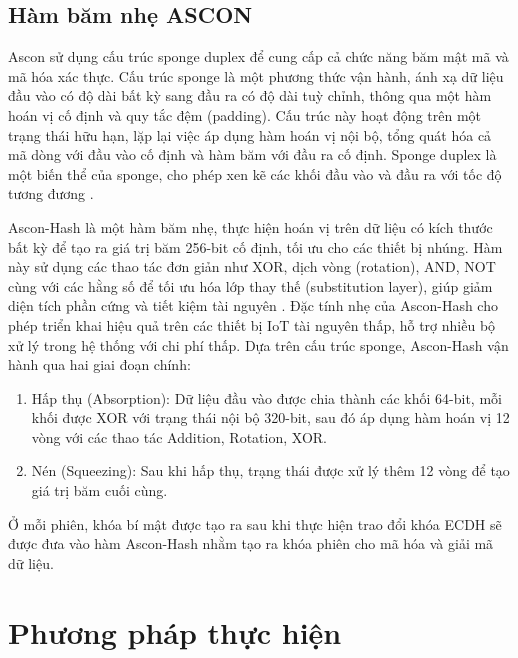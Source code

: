 \subsection{Hàm băm nhẹ ASCON}
\label{sec:ascon-hash}
Ascon sử dụng cấu trúc sponge duplex để cung cấp cả chức năng băm mật mã và mã hóa xác thực. Cấu trúc sponge là một phương thức vận hành, ánh xạ dữ liệu đầu vào có độ dài bất kỳ sang đầu ra có độ dài tuỳ chỉnh, thông qua một hàm hoán vị cố định và quy tắc đệm (padding). Cấu trúc này hoạt động trên một trạng thái hữu hạn, lặp lại việc áp dụng hàm hoán vị nội bộ, tổng quát hóa cả mã dòng với đầu vào cố định và hàm băm với đầu ra cố định. Sponge duplex là một biến thể của sponge, cho phép xen kẽ các khối đầu vào và đầu ra với tốc độ tương đương \cite{Ascon-Hash}.

Ascon-Hash là một hàm băm nhẹ, thực hiện hoán vị trên dữ liệu có kích thước bất kỳ để tạo ra giá trị băm 256-bit cố định, tối ưu cho các thiết bị nhúng. Hàm này sử dụng các thao tác đơn giản như XOR, dịch vòng (rotation), AND, NOT cùng với các hằng số để tối ưu hóa lớp thay thế (substitution layer), giúp giảm diện tích phần cứng và tiết kiệm tài nguyên \cite{Ascon-Hash}. Đặc tính nhẹ của Ascon-Hash cho phép triển khai hiệu quả trên các thiết bị IoT tài nguyên thấp, hỗ trợ nhiều bộ xử lý trong hệ thống với chi phí thấp.
Dựa trên cấu trúc sponge, Ascon-Hash vận hành qua hai giai đoạn chính: 
\begin{enumerate}
    \item Hấp thụ (Absorption): Dữ liệu đầu vào được chia thành các khối 64-bit, mỗi khối được XOR với trạng thái nội bộ 320-bit, sau đó áp dụng hàm hoán vị 12 vòng với các thao tác Addition, Rotation, XOR.
    \item Nén (Squeezing): Sau khi hấp thụ, trạng thái được xử lý thêm 12 vòng để tạo giá trị băm cuối cùng. 
\end{enumerate}
Ở mỗi phiên, khóa bí mật được tạo ra sau khi thực hiện trao đổi khóa ECDH sẽ được đưa vào hàm Ascon-Hash nhằm tạo ra khóa phiên cho mã hóa và giải mã dữ liệu.

\section{Phương pháp thực hiện}
\label{sec:phuongphap}
